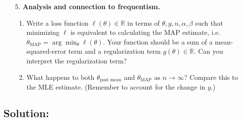 \documentclass[submit]{harvardml}
\begin{document}
\begin{framed}
\begin{enumerate}
  \item[5.]
    \textbf{Analysis and connection to frequentism.}
  
    \begin{enumerate}
    \item
      Write a loss function \(\ell(\theta) \in \mathbb{R}\) in terms of
      \(\theta, y, n, \alpha, \beta\) such that minimizing \(\ell\) is
      equivalent to calculating the MAP estimate,
      i.e.~\(\theta_{\text{MAP}} = \arg \min_{\theta} \ell(\theta)\). Your
      function should be a sum of a mean-squared-error term and a
      regularization term \(g(\theta) \in \mathbb{R}\). Can you interpret
      the regularization term? \footnotemark[2]
    \item
      What happens to both $\theta_{\text{post mean}}$ and $\theta_{\text{MAP}}$ as \(n \to \infty\)? Compare this to the MLE estimate.
      (Remember to account for the change in \(y\).)
    \end{enumerate}
  
\end{enumerate}

\end{framed}



\subsection*{Solution:}

\newpage
\end{document}
